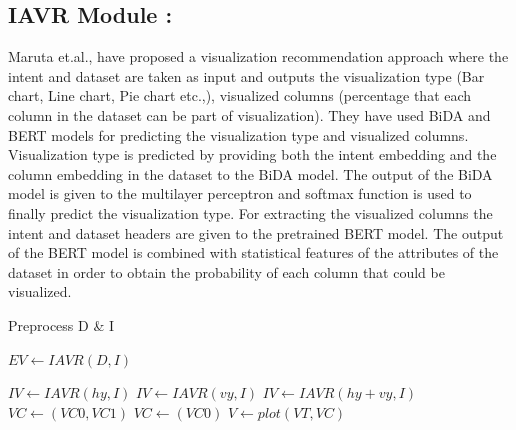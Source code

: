 \subsection{IAVR Module \cite{maruta2021intent}:} Maruta et.al.,\cite{maruta2021intent} have proposed a visualization recommendation approach where the intent and dataset are taken as input and outputs the visualization type (Bar chart, Line chart, Pie chart etc.,), visualized columns (percentage that each column in the dataset can be part of visualization). They have used BiDA \cite{seo2016bidirectional} and BERT \cite{devlin2018bert} models for predicting the visualization type and visualized columns. Visualization type is predicted by providing both the intent embedding and the column embedding in the dataset to the BiDA model. The output of the BiDA model is given to the multilayer perceptron and softmax function is used to finally predict the visualization type. For extracting the visualized columns the intent and dataset headers are given to the pretrained BERT model. The output of the BERT model is combined with statistical features of the attributes of the dataset in order to obtain the probability of each column that could be visualized.

\begin{algorithm}[!h]
\caption{Incremental Visualization Recommendation (IVR)}\label{algo1}
Preprocess D \& I

\(EV \leftarrow IAVR(D,I)\)

{
\(IV \leftarrow IAVR(hy,I)\)
}   
{
    \(IV \leftarrow IAVR(vy,I)\)
}
{
    \(IV \leftarrow IAVR(hy+vy,I)\)
}
{
    {
        \(VC \leftarrow (VC0,VC1)\)
    }
    \Else
    {    
    \(VC \leftarrow (VC0)\)
    }
}
    \(V \leftarrow plot(VT, VC)\)
    
\end{algorithm}
